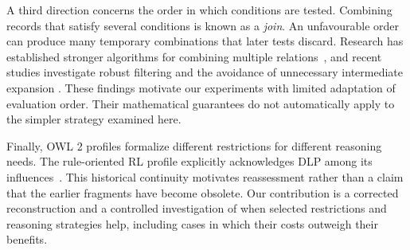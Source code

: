 A third direction concerns the order in which conditions are tested. Combining
records that satisfy several conditions is known as a \emph{join}. An
unfavourable order can produce many temporary combinations that later tests
discard. Research has established stronger algorithms for combining multiple
relations~\cite{ngo2012}, and recent studies investigate robust filtering
and the avoidance of unnecessary intermediate expansion
\cite{qiao2026,bekkers2025}. These findings motivate our experiments with
limited adaptation of evaluation order. Their mathematical guarantees do not
automatically apply to the simpler strategy examined here.

Finally, OWL 2 profiles formalize different restrictions for different
reasoning needs. The rule-oriented RL profile explicitly acknowledges DLP
among its influences~\cite{owlprofiles2012}. This historical continuity
motivates reassessment rather than a claim that the earlier fragments have
become obsolete. Our contribution is a corrected reconstruction and a
controlled investigation of when selected restrictions and reasoning
strategies help, including cases in which their costs outweigh their benefits.

